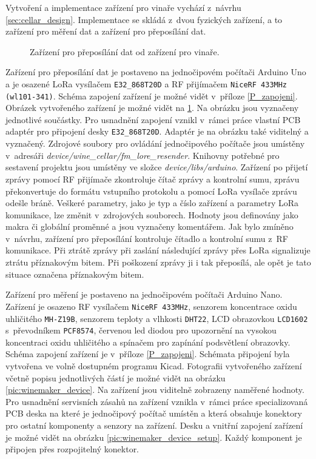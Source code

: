 Vytvoření a implementace zařízení pro vinaře vychází z~návrhu \ref{sec:cellar_design}. Implementace se skládá z~dvou fyzických zařízení, a to zařízení pro měření dat a zařízení pro přeposílání dat. 

\begin{figure}[h]
  \centering
  
  \caption{Zařízení pro přeposílání dat od zařízení pro vinaře.}
  \label{pic:resender_device}
\end{figure}

Zařízení pro přeposílání dat je postaveno na jednočipovém počítači Arduino Uno a je osazené LoRa vysílačem \texttt{E32\_868T20D} a RF přijímačem \texttt{NiceRF 433MHz (wl101-341)}. Schéma zapojení zařízení je možné vidět v~příloze \ref{P_zapojeni}. Obrázek vytvořeného zařízení je možné vidět na \ref{pic:resender_device}. Na obrázku jsou vyznačeny jednotlivé součástky. Pro usnadnění zapojení vznikl v~rámci práce vlastní PCB adaptér pro připojení desky \texttt{E32\_868T20D}. Adaptér je na obrázku také viditelný a vyznačený. Zdrojové soubory pro ovládání jednočipového počítače jsou umístěny v~adresáři \textit{device/wine\_cellar/fm\_lore\_resender}. Knihovny potřebné pro sestavení projektu jsou umístěny ve složce \textit{device/libs/arduino}. Zařízení po přijetí zprávy pomocí RF přijímače zkontroluje čítač zprávy a kontrolní sumu, zprávu překonvertuje do formátu vstupního protokolu a pomocí LoRa vysílače zprávu odešle bráně. Veškeré parametry, jako je typ a číslo zařízení a parametry LoRa komunikace, lze změnit v~zdrojových souborech. Hodnoty jsou definovány jako makra či globální proměnné a jsou vyznačeny komentářem. Jak bylo zmíněno v~návrhu, zařízení pro přeposílání kontroluje čítadlo a kontrolní sumu z~RF komunikace. Při ztrátě zprávy při zaslání následující zprávy přes LoRa signalizuje ztrátu příznakovým bitem. Při poškození zprávy ji i tak přeposílá, ale opět je tato situace označena příznakovým bitem.

Zařízení pro měření je postaveno na jednočipovém počítači Arduino Nano. Zařízení je osazeno RF vysílačem \texttt{NiceRF 433MHz}, senzorem koncentrace oxidu uhličitého \texttt{MH-Z19B}, senzorem teploty a vlhkosti \texttt{DHT22}, LCD obrazovkou \texttt{LCD1602} s~převodníkem \texttt{PCF8574}, červenou led diodou pro upozornění na vysokou koncentraci oxidu uhličitého a spínačem pro zapínání podsvětlení obrazovky. Schéma zapojení zařízení je v~příloze \ref{P_zapojeni}. Schémata připojení byla vytvořena ve volně dostupném programu Kicad. Fotografii vytvořeného zařízení včetně popisu jednotlivých částí je možné vidět na obrázku \ref{pic:winemaker_device}. Na zařízení jsou viditelně zobrazeny naměřené hodnoty. Pro usnadnění servisních zásahů na zařízení vznikla v~rámci práce specializovaná PCB deska na které je jednočipový počítač umístěn a která obsahuje konektory pro ostatní komponenty a senzory na zařízení. Desku a vnitřní zapojení zařízení je možné vidět na obrázku \ref{pic:winemaker_device_setup}. Každý komponent je připojen přes rozpojitelný konektor. 

